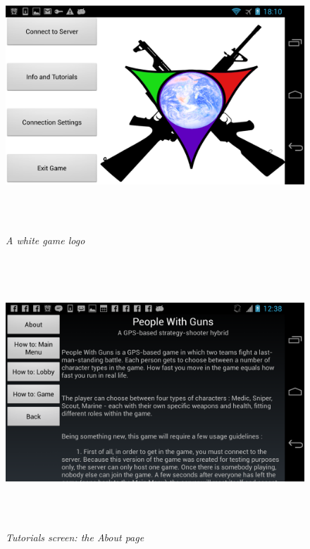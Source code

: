 \documentclass{article}
\begin{document}
\begin{figure}
\includegraphics[height=4in,width=7.12in]{./images/android_screenshots/logo_white.png}
\caption{\small \sl A white game logo \label{fig:logo_white}}
\end{figure}

\begin{figure}
\includegraphics[height=4in,width=7.12in]{./images/android_screenshots/tutorial_fragment_1.png}
\caption{\small \sl Tutorials screen: the About
page\label{fig:tutorial_fragment1}}
\end{figure}
\end{document}
